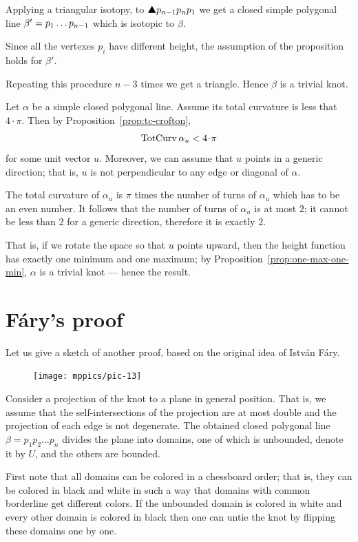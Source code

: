 Applying a triangular isotopy, to $\solidtriangle p_{n-1}p_np_1$ we get a closed simple polygonal line $\beta'\z=p_1\dots p_{n-1}$ which is isotopic to $\beta$.

Since all the vertexes $p_i$ have different height,
the assumption of the proposition holds for $\beta'$.

Repeating this procedure $n-3$ times we get a triangle.
Hence $\beta$ is a trivial knot.
\qeds

Let $\alpha$ be a simple closed polygonal line.
Assume its total curvature is less that $4\cdot\pi$.
Then by Proposition~\ref{prop:tc-crofton}, 
\[\tc\alpha_u<4\cdot\pi\]
for some unit vector $u$.
Moreover, we can assume that $u$ points in a generic direction;
that is, $u$ is not perpendicular to any edge or diagonal of $\alpha$.

The total curvature of $\alpha_u$ is $\pi$ times the number of turns of $\alpha_u$
which has to be an even number.
It follows that the number of turns of $\alpha_u$ is at most $2$;
it cannot be less than 2 for a generic direction, therefore it is exactly $2$.

That is, if we rotate the space so that $u$ points upward,
then the height function has exactly one minimum and one maximum;
by Proposition~\ref{prop:one-max-one-min}, $\alpha$ is a trivial knot --- hence the result.
\qeds

\section{F\'ary's proof}

Let us give a sketch of another proof, based on the original idea of Istv\'an F\'ary.

\begin{figure}
\vskip-0mm
\centering
\texttt{[image: mppics/pic-13]}
\vskip0mm
\end{figure}

Consider a projection of the knot to a plane in general position.
That is, we assume that the self-intersections of the projection are at most double and the projection of each edge is not degenerate.
The obtained closed polygonal line $\beta=p_1p_2\dots p_n$ divides the plane into domains, one of which is unbounded, denote it by $U$, and the others are bounded.

First note that all domains can be colored in a chessboard order;
that is, they can be colored in black and white in such a way that domains with common borderline get different colors.
If the unbounded domain is colored in white and every other domain is colored in black then one can untie the knot by flipping these domains one by one.

